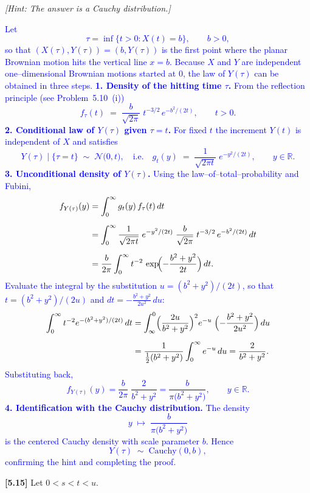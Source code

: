 \documentclass{article}
\begin{document}
\textit{[Hint: The answer is a Cauchy distribution.]}

\textcolor{blue}{
Let  
$$
\tau=\inf\{t>0:X(t)=b\},\qquad b>0,
$$  
so that $(X(\tau),Y(\tau))=(b,Y(\tau))$ is the first point where the planar Brownian motion hits the vertical line $x=b$.  
Because $X$ and $Y$ are independent one–dimensional Brownian motions started at $0$, the law of $Y(\tau)$ can be obtained in three steps.
\medskip
\textbf{1.  Density of the hitting time $\tau$.}  
From the reflection principle (see Problem 5.10 (i))  
$$
f_\tau(t)\;=\;\frac{b}{\sqrt{2\pi}}\;t^{-3/2}\,e^{-b^{2}/(2t)},\qquad t>0.
$$  
\medskip
\textbf{2.  Conditional law of $Y(\tau)$ given $\tau=t$.}  
For fixed $t$ the increment $Y(t)$ is independent of $X$ and satisfies  
$$
Y(\tau)\mid\{\tau=t\}\;\sim\;\mathcal N\!\bigl(0,t\bigr),
\quad\text{i.e.}\quad
g_t(y)\;=\;\frac{1}{\sqrt{2\pi t}}\;e^{-y^{2}/(2t)},\qquad y\in\mathbb R.
$$  
\medskip
\textbf{3.  Unconditional density of $Y(\tau)$.}  Using the law–of–total–probability and Fubini,
$$
\begin{aligned}
f_{Y(\tau)}(y)
&=\int_{0}^{\infty}g_t(y)\,f_\tau(t)\,dt\\[6pt]
&=\int_{0}^{\infty}
      \frac{1}{\sqrt{2\pi t}}\;e^{-y^{2}/(2t)}
      \;\frac{b}{\sqrt{2\pi}}\;t^{-3/2}\,e^{-b^{2}/(2t)}\,dt\\[6pt]
&=\frac{b}{2\pi}\int_{0}^{\infty}t^{-2}\,
      \exp\!\Bigl(-\frac{b^{2}+y^{2}}{2t}\Bigr)\,dt.
\end{aligned}
$$
Evaluate the integral by the substitution $u=(b^{2}+y^{2})/(2t)$, so that  
$t=(b^{2}+y^{2})/(2u)$ and $dt=-\tfrac{b^{2}+y^{2}}{2u^{2}}\,du$:
$$
\begin{aligned}
\int_{0}^{\infty}t^{-2}e^{-(b^{2}+y^{2})/(2t)}\,dt
&=\int_{\infty}^{0}\Bigl(\frac{2u}{b^{2}+y^{2}}\Bigr)^{2}
      e^{-u}\;\Bigl(-\frac{b^{2}+y^{2}}{2u^{2}}\Bigr)\,du\\[6pt]
&=\frac{1}{\tfrac{1}{2}(b^{2}+y^{2})}\int_{0}^{\infty}e^{-u}\,du
      =\frac{2}{b^{2}+y^{2}}.
\end{aligned}
$$
Substituting back,
$$
f_{Y(\tau)}(y)=\frac{b}{2\pi}\;\frac{2}{b^{2}+y^{2}}
              =\frac{b}{\pi\bigl(b^{2}+y^{2}\bigr)},\qquad y\in\mathbb R.
$$  
\medskip
\textbf{4.  Identification with the Cauchy distribution.}  
The density
$$
y\;\longmapsto\;\frac{b}{\pi\bigl(b^{2}+y^{2}\bigr)}
$$
is the centered Cauchy density with scale parameter $b$.  Hence  
$$
Y(\tau)\;\sim\;\text{Cauchy}(0,b),
$$
confirming the hint and completing the proof.  
}


\textbf{[5.15]} Let $0 < s < t < u$.
\end{document}
